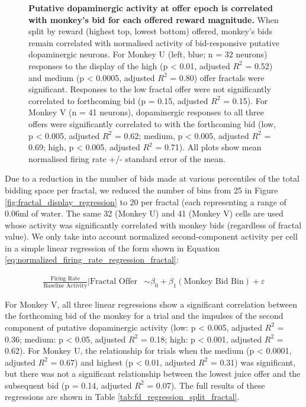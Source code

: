 \begin{figure}[p] 
\centering    

\caption[Putative dopaminergic activity at offer epoch is correlated with monkey's bid for each offered reward magnitude.]{\textbf{Putative dopaminergic activity at offer epoch is correlated with monkey's bid for each offered reward magnitude.} When split by reward (highest top, lowest bottom) offered, monkey's bids remain correlated with normalised activity of bid-responsive putative dopaminergic neurons. For Monkey U (left, blue; n = 32 neurons) responses to the display of the high (p < 0.01, adjusted $R^2$ = 0.52) and medium (p < 0.0005, adjusted $R^2$ = 0.80) offer fractals were significant. Responses to the low fractal offer were not significantly correlated to forthcoming bid (p = 0.15, adjusted $R^2$ = 0.15). For Monkey V (n = 41 neurons), dopaminergic responses to all three offers were significantly correlated to with the forthcoming bid (low, p < 0.005, adjusted $R^2$ = 0.62; medium, p < 0.005, adjusted $R^2$ = 0.69; high, p < 0.005, adjusted $R^2$ = 0.71). All plots show mean normalised firing rate +/- standard error of the mean.}
\label{fig:fractal_display_regression_split}
\end{figure}

Due to a reduction in the number of bids made at various percentiles of the total bidding space per fractal, we reduced the number of bins from 25 in Figure \ref{fig:fractal_display_regression} to 20 per fractal (each representing a range of 0.06ml of water. The same 32 (Monkey U) and 41 (Monkey V) cells are used whose activity was significantly correlated with monkey bids (regardless of fractal value). We only take into account normalized second-component activity per cell in a simple linear regression of the form shown in Equation \ref{eq:normalized_firing_rate_regression_fractal}:

\begin{align}
\frac{\text{Firing Rate}}{\text{Baseline Activity}} | \text{Fractal Offer} &\sim \beta_0 + \beta_1(\text{Monkey Bid Bin}) + \varepsilon \label{eq:normalized_firing_rate_regression_fractal}
\end{align}

For Monkey V, all three linear regressions show a significant correlation between the forthcoming bid of the monkey for a trial and the impulses of the second component of putative dopaminergic activity (low: p < 0.005, adjusted $R^2$ = 0.36; medium: p < 0.05, adjusted $R^2$ = 0.18; high: p < 0.001, adjusted $R^2$ = 0.62). For Monkey U, the relationship for trials when the medium (p < 0.0001, adjusted $R^2$ = 0.67) and highest (p < 0.01, adjusted $R^2$ = 0.31) was significant, but there was not a significant relationship between the lowest juice offer and the subsequent bid (p = 0.14, adjusted $R^2$ = 0.07). The full results of these regressions are shown in Table \ref{tab:fd_regression_split_fractal}.

